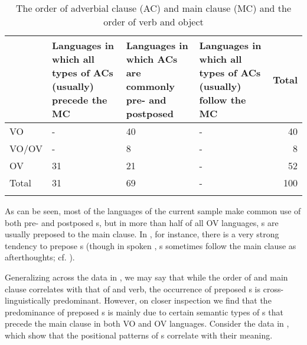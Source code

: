 \documentclass[output=paper]{langsci/langscibook}
\begin{document}
\begin{table}
\small
\begin{tabularx}{\textwidth}{lYYYr}
\lsptoprule
&   Languages in which all types of ACs (usually) precede the MC &   Languages in which ACs are commonly pre- and postposed &   Languages in which all types of ACs (usually) follow the MC &   Total\\
\midrule 
VO & - & 40 & - & 40\\
VO/OV & - & 8 & - & 8\\
OV & 31 & 21 & - & 52\\
\midrule
Total & 31 & 69 & - & 100\\
\lspbottomrule
\end{tabularx}

\caption{The order of adverbial clause (AC) and main clause (MC) and the order of verb and object}
\label{tab:diessel:1}
\end{table}

As can be seen, most of the languages of the current sample make common use of both pre- and postposed s, but in more than half of all OV languages, s are usually preposed to the main clause. In , for instance, there is a very strong tendency to prepose s (though in spoken , s sometimes follow the main clause as afterthoughts; cf. \citealt{FordMori1994}).

Generalizing across the data in , we may say that while the order of  and main clause correlates with that of  and verb, the occurrence of preposed s is cross-linguistically predominant. However, on closer inspection we find that the predominance of preposed s is mainly due to certain semantic types of s that precede the main clause in both VO and OV languages. Consider the data in , which show that the positional patterns of s correlate with their meaning.  
\end{document}

